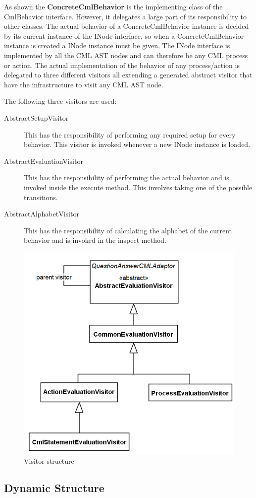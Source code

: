 \documentclass[a4paper, 12pt]{include/compassreport}   %
\begin{document}
As shown the \textbf{ConcreteCmlBehavior} is the implementing class of
the CmlBehavior interface. However, it delegates a large part of its
responsibility to other classes. The actual behavior of a
ConcreteCmlBehavior instance is decided by its current instance of the
INode interface, so when a ConcreteCmlBehavior instance is created a
INode instance must be given. The INode interface is implemented by
all the CML AST nodes and can therefore be any CML process or action.
The actual implementation of the behavior of any process/action is
delegated to three different visitors all extending a generated
abstract visitor that have the infrastructure to visit any CML AST
node.

The following three visitors are used:  
\begin{description}
\item[AbstractSetupVisitor] This has the responsibility of performing
  any required setup for every behavior. This visitor is invoked
  whenever a new INode instance is loaded.
\item[AbstractEvaluationVisitor] This has the responsibility of
  performing the actual behavior and is invoked inside the execute
  method. This involves taking one of the possible transitions.
\item[AbstractAlphabetVisitor] This has the responsibility of
  calculating the alphabet of the current behavior and is invoked in the
  inspect method.
\end{description}



\begin{figure}[ht!]
  \begin{center}
    \includegraphics[width=1\textwidth]{figures/Visitors}
    \caption{Visitor structure}
    \label{fig:visitors}
  \end{center}
\end{figure}



\subsection{Dynamic Structure}
\label{sec:dynamic_structure}


\newpage

 
\label{ch:bib} %
\end{document}
